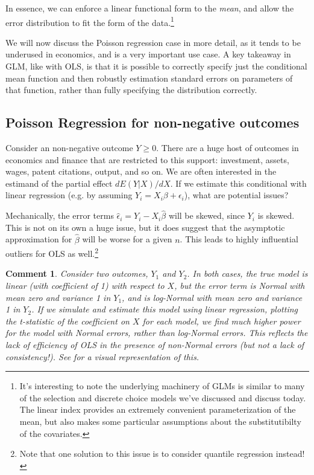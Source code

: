 \documentclass{tufte-handout}
\theoremstyle{break}
\newtheorem{cmt}{Comment}
\begin{document}
In essence, we can enforce a linear functional form to the \emph{mean}, and allow the error distribution to fit the form of the data.\footnote{It's interesting to note the underlying machinery of GLMs is similar to many of the selection and discrete choice models we've discussed and discuss today. The linear index provides an extremely convenient parameterization of the mean, but also makes some particular assumptions about the substitutibilty of the covariates.} 

We will now discuss the Poisson regression case in more detail, as it tends to be underused in economics, and is a very important use case. A key takeaway in GLM, like with OLS, is that it is possible to correctly specify just the conditional mean function and then robustly estimation standard errors on parameters of that function, rather than fully specifying the distribution correctly.

\subsection{Poisson Regression for non-negative outcomes}

Consider an non-negative outcome $Y \geq 0$. There are a huge host of outcomes in economics and finance that are restricted to this support: investment, assets, wages, patent citations, output, and so on. We are often interested in the estimand of the partial effect $dE(Y | X) / dX$. If we estimate this conditional with linear regression (e.g. by assuming $Y_{i} = X_{i}\beta + \epsilon_{i}$), what are potential issues?

Mechanically, the error terms $\hat{\epsilon}_{i} = Y_{i} - X_{i}\hat{\beta}$ will be skewed, since $Y_{i}$ is skewed. This is not on its own a huge issue, but it does suggest that the asymptotic approximation for $\hat{\beta}$ will be worse for a given $n$. This leads to highly influential outliers for OLS as well.\footnote{Note that one solution to this issue is to consider quantile regression instead!} 


\begin{boxF}
\begin{cmt}
  Consider two outcomes, $Y_{1}$ and $Y_{2}$. In both cases, the true model is linear (with coefficient of 1) with respect to $X$, but the error term is Normal with mean zero and variance 1 in $Y_{1}$, and is log-Normal with mean zero and variance 1 in $Y_{2}$. If we simulate and estimate this model using linear regression, plotting the t-statistic of the coefficient on $X$ for each model, we find much higher power for the model with Normal errors, rather than log-Normal errors. This reflects the lack of efficiency of OLS in the presence of non-Normal errors (but not a lack of consistency!). See  for a visual representation of this.
\end{cmt}
\end{boxF}
\end{document}
